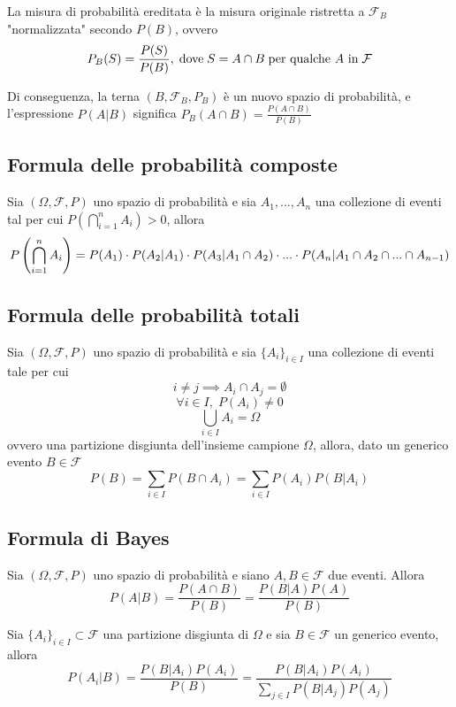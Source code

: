 \documentclass{article}
\begin{document}
        La misura di probabilità ereditata è la misura originale ristretta a $\mathcal{F}_{B}$ "normalizzata" secondo $P(B)$, ovvero
        \[
            P_{B}(S) = \frac{P(S)}{P(B)}, \; \textnormal{dove} \; S = A \cap B \; \textnormal{per qualche $A$ in} \; \mathcal{F}
        \]

        Di conseguenza, la terna $(B, \mathcal{F}_{B}, P_{B})$ è un nuovo spazio di probabilità, e l'espressione $P(A|B)$ significa $P_{B}(A \cap B) = \displaystyle \frac{P(A \cap B)}{P(B)}$

        \subsection{Formula delle probabilità composte}
            Sia $(\Omega, \mathcal{F}, P)$ uno spazio di probabilità e sia $A_{1}, ..., A_{n}$ una collezione di eventi tal per cui $P(\bigcap_{i = 1}^{n} A_{i}) > 0$, allora
            \[
                P\qty(\bigcap_{i = 1}^{n} A_{i}) = P(A_{1}) \cdot P(A_{2} | A_{1}) \cdot P(A_{3} | A_{1} \cap A_{2}) \cdot ... \cdot P(A_{n} | A_{1} \cap A_{2} \cap ... \cap A_{n - 1})
            \]

        \subsection{Formula delle probabilità totali}
            Sia $(\Omega, \mathcal{F}, P)$ uno spazio di probabilità e sia $\{A_{i}\}_{i \in I}$ una collezione di eventi tale per cui 
            \[
                i \neq j \implies A_{i} \cap A_{j} = \emptyset
            \] 
            \[
                \forall i \in I, \; P(A_{i}) \neq 0
            \]
            \[
                \bigcup_{i \in I} A_{i} = \Omega
            \]
            ovvero una partizione disgiunta dell'insieme campione $\Omega$, allora, dato un generico evento $B \in \mathcal{F}$
            \[
                P(B) = \sum_{i \in I} P(B \cap A_{i}) = \sum_{i \in I} P(A_{i})P(B | A_{i})
            \]

        \subsection{Formula di Bayes}
            Sia $(\Omega, \mathcal{F}, P)$ uno spazio di probabilità e siano $A, B \in \mathcal{F}$ due eventi.
            Allora
            \[
                P(A | B) = \frac{P(A \cap B)}{P(B)} = \frac{P(B | A)P(A)}{P(B)}
            \]

            Sia $\{A_{i}\}_{i \in I} \subset \mathcal{F}$ una partizione disgiunta di $\Omega$ e sia $B \in \mathcal{F}$ un generico evento, allora
            \[
                P(A_{i} | B) = \frac{P(B | A_{i})P(A_{i})}{P(B)} = \frac{P(B | A_{i})P(A_{i})}{\sum_{j \in I} P(B | A_{j})P(A_{j})}
            \]
\end{document}

